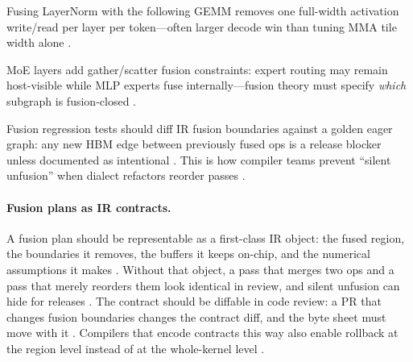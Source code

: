 \begin{example}
Fusing LayerNorm with the following GEMM removes one full-width activation write/read per layer per token---often larger decode win than tuning MMA tile width alone \citep{memoryfloor2026,taxbreak2026,yirage2026,patel2025llminference}.
\end{example}

MoE layers add gather/scatter fusion constraints: expert routing may remain host-visible while MLP experts fuse internally---fusion theory must specify \emph{which} subgraph is fusion-closed \citep{taxbreak2026,liu2024deepseekv3,kwon2023vllm,yirage2026,nvidia2024cudagraphs,chen2020compilerbasedhardw,amd2024xdna,semianalysis2024tma,dlbook,dao2022flashattention,dao2023flashdecoding,nvidia2022hopper,amd2024aie,patel2025llminference,memoryfloor2026}.

Fusion regression tests should diff IR fusion boundaries against a golden eager graph: any new HBM edge between previously fused ops is a release blocker unless documented as intentional \citep{yirage2026,chen2020compilerbasedhardw,memoryfloor2026,taxbreak2026,patel2025llminference,dao2022flashattention,nvidia2024cudagraphs,semianalysis2024tma,dlbook}. This is how compiler teams prevent ``silent unfusion'' when dialect refactors reorder passes \citep{chen2020compilerbasedhardw,yirage2026,liu2024deepseekv3,amd2024aie,amd2024xdna}.

\paragraph{Fusion plans as IR contracts.}
A fusion plan should be representable as a first-class IR object: the fused region, the boundaries it removes, the buffers it keeps on-chip, and the numerical assumptions it makes \citep{yirage2026,chen2020compilerbasedhardw,dao2022flashattention}. Without that object, a pass that merges two ops and a pass that merely reorders them look identical in review, and silent unfusion can hide for releases \citep{memoryfloor2026,taxbreak2026}. The contract should be diffable in code review: a PR that changes fusion boundaries changes the contract diff, and the byte sheet must move with it \citep{patel2025llminference,chen2020compilerbasedhardw}. Compilers that encode contracts this way also enable rollback at the region level instead of at the whole-kernel level \citep{yirage2026,memoryfloor2026}.

